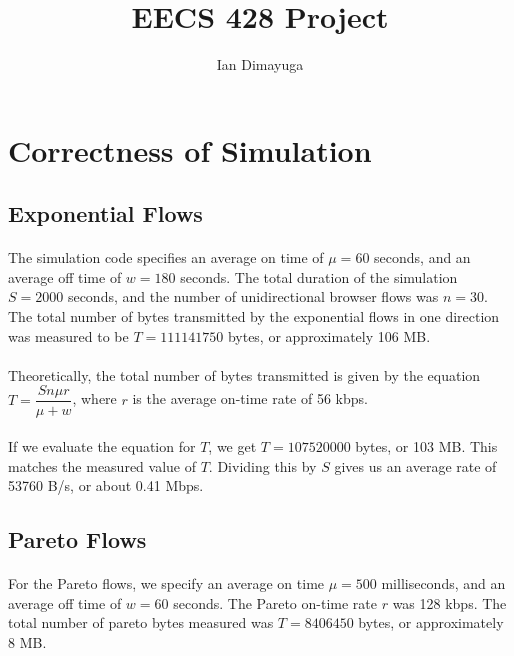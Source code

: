 \documentclass{article}
\begin{document}
  \title{EECS 428 Project}
  \author{Ian Dimayuga}
  \maketitle

  \section{Correctness of Simulation}
    \subsection{Exponential Flows}
      \paragraph{}
        The simulation code specifies an average on time of $\mu = 60$ seconds, and an average off time of $w = 180$ seconds.
        The total duration of the simulation $S = 2000$ seconds, and the number of unidirectional browser flows was $n = 30$.
        The total number of bytes transmitted by the exponential flows in one direction was measured to be $T = 111141750$ bytes, or approximately 106 MB.

      \paragraph{}
        Theoretically, the total number of bytes transmitted is given by the equation $T = \dfrac{S n \mu r}{\mu + w}$, where $r$ is the average on-time rate of 56 kbps.

      \paragraph{}
        If we evaluate the equation for $T$, we get $T = 107520000$ bytes, or 103 MB. This matches the measured value of $T$.
        Dividing this by $S$ gives us an average rate of 53760 B/s, or about 0.41 Mbps.

    \subsection{Pareto Flows}
      \paragraph{}
        For the Pareto flows, we specify an average on time $\mu = 500$ milliseconds, and an average off time of $w = 60$ seconds.
        The Pareto on-time rate $r$ was 128 kbps.
        The total number of pareto bytes measured was $T = 8406450$ bytes, or approximately 8 MB.
\end{document}
